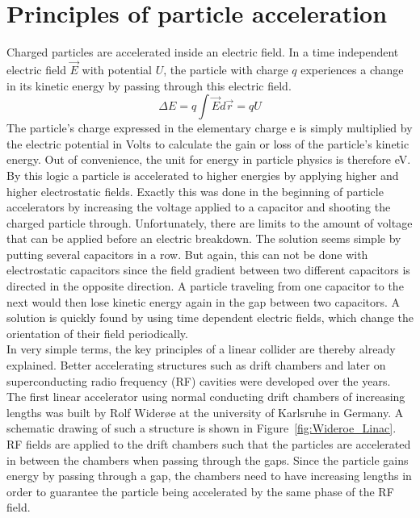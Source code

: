 \section{Principles of particle acceleration}
\label{AccPhysics:Principles}
Charged particles are accelerated inside an electric field. 
In a time independent electric field $\vec{E}$ with potential $U$, the particle with charge $q$ experiences a change in its kinetic energy by passing through this electric field.
\begin{equation}
 \Delta E = q \int \vec{E}d\vec{r} = qU
\end{equation}
The particle's charge expressed in the elementary charge e is simply multiplied by the electric potential in Volts to calculate the gain or loss of the particle's kinetic energy. 
Out of convenience, the unit for energy in particle physics is therefore eV.\\
By this logic a particle is accelerated to higher energies by applying higher and higher electrostatic fields. 
Exactly this was done in the beginning of particle accelerators by increasing the voltage applied to a capacitor and shooting the charged particle through. 
Unfortunately, there are limits to the amount of voltage that can be applied before an electric breakdown.
The solution seems simple by putting several capacitors in a row.
But again, this can not be done with electrostatic capacitors since the field gradient between two different capacitors is directed in the opposite direction.
A particle traveling from one capacitor to the next would then lose kinetic energy again in the gap between two capacitors.
A solution is quickly found by using time dependent electric fields, which change the orientation of their field periodically.\\
In very simple terms, the key principles of a linear collider are thereby already explained.
Better accelerating structures such as drift chambers and later on superconducting radio frequency (RF) cavities were developed over the years.
The first linear accelerator using normal conducting drift chambers of increasing lengths was built by Rolf Wider\o e at the university of Karlsruhe in Germany.
A schematic drawing of such a structure is shown in Figure~\ref{fig:Wideroe_Linac}.
RF fields are applied to the drift chambers such that the particles are accelerated in between the chambers when passing through the gaps.
Since the particle gains energy by passing through a gap, the chambers need to have increasing lengths in order to guarantee the particle being accelerated by the same phase of the RF field.

